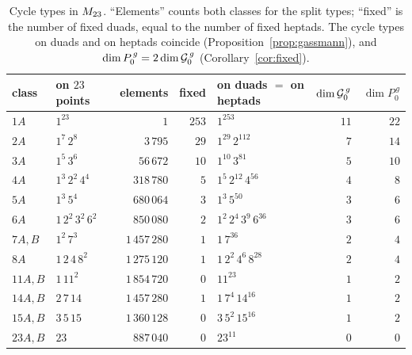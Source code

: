 \begin{table}[ht]
\centering\footnotesize
\begin{tabular}{@{}llrrlrr@{}}
\toprule
class & on $23$ points & elements & fixed & on duads $=$ on heptads & $\dim\mathcal{G}_0^{\,g}$ & $\dim P_0^{\,g}$\\
\midrule
$1A$ & $1^{23}$ & $1$ & $253$ & $1^{253}$ & $11$ & $22$\\
$2A$ & $1^{7}\,2^{8}$ & $3\,795$ & $29$ & $1^{29}\,2^{112}$ & $7$ & $14$\\
$3A$ & $1^{5}\,3^{6}$ & $56\,672$ & $10$ & $1^{10}\,3^{81}$ & $5$ & $10$\\
$4A$ & $1^{3}\,2^{2}\,4^{4}$ & $318\,780$ & $5$ & $1^{5}\,2^{12}\,4^{56}$ & $4$ & $8$\\
$5A$ & $1^{3}\,5^{4}$ & $680\,064$ & $3$ & $1^{3}\,5^{50}$ & $3$ & $6$\\
$6A$ & $1\,2^{2}\,3^{2}\,6^{2}$ & $850\,080$ & $2$ & $1^{2}\,2^{4}\,3^{9}\,6^{36}$ & $3$ & $6$\\
$7A,B$ & $1^{2}\,7^{3}$ & $1\,457\,280$ & $1$ & $1\,7^{36}$ & $2$ & $4$\\
$8A$ & $1\,2\,4\,8^{2}$ & $1\,275\,120$ & $1$ & $1\,2^{2}\,4^{6}\,8^{28}$ & $2$ & $4$\\
$11A,B$ & $1\,11^{2}$ & $1\,854\,720$ & $0$ & $11^{23}$ & $1$ & $2$\\
$14A,B$ & $2\,7\,14$ & $1\,457\,280$ & $1$ & $1\,7^{4}\,14^{16}$ & $1$ & $2$\\
$15A,B$ & $3\,5\,15$ & $1\,360\,128$ & $0$ & $3\,5^{2}\,15^{16}$ & $1$ & $2$\\
$23A,B$ & $23$ & $887\,040$ & $0$ & $23^{11}$ & $0$ & $0$\\
\bottomrule
\end{tabular}
\caption{Cycle types in $M_{23}$. ``Elements'' counts both classes for the split types; ``fixed'' is the number of fixed duads, equal to the number of fixed heptads. The cycle types on duads and on heptads coincide (Proposition~\ref{prop:gassmann}), and $\dim P_0^{\,g}=2\dim\mathcal{G}_0^{\,g}$ (Corollary~\ref{cor:fixed}).}
\label{tab:classes}
\end{table}
